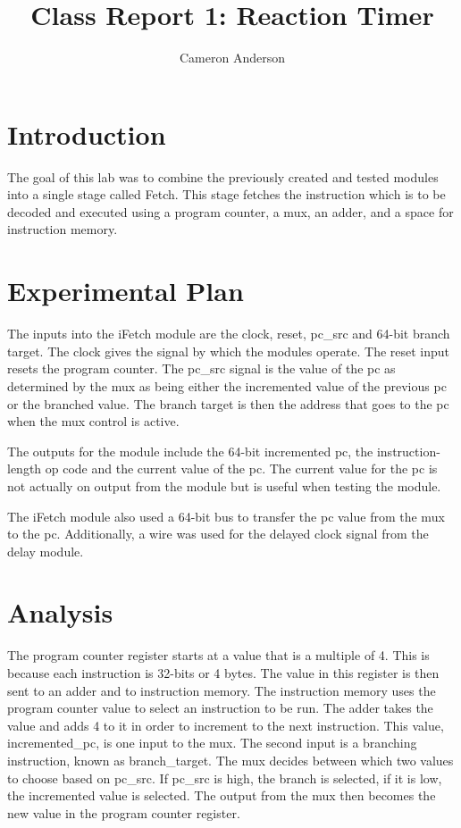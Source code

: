 \documentclass{article}
\author{Cameron Anderson}
\title{Class Report 1: Reaction Timer}
\begin{document}
\maketitle

\section{Introduction}
The goal of this lab was to combine the previously created and tested modules into a single stage called Fetch. This stage fetches the instruction which is to be decoded and executed using a program counter, a mux, an adder, and a space for instruction memory.

\section{Experimental Plan}
The inputs into the iFetch module are the clock, reset, pc\_src and 64-bit branch target. The clock gives the signal by which the modules operate. The reset input resets the program counter. The pc\_src signal is the value of the pc as determined by the mux as being either the incremented value of the previous pc or the branched value.  The branch target is then the address that goes to the pc when the mux control is active.
     
The outputs for the module include the 64-bit incremented pc, the instruction-length op code and the current value of the pc. The current value for the pc is not actually on output from the module but is useful when testing the module. 

The iFetch module also used a 64-bit bus to transfer the pc value from the mux to the pc. Additionally, a wire was used for the delayed clock signal from the delay module.

\section{Analysis}
The program counter register starts at a value that is a multiple of 4. This is because each instruction is 32-bits or 4 bytes. The value in this register is then sent to an adder and to instruction memory. The instruction memory uses the program counter value to select an instruction to be run. The adder takes the value and adds 4 to it in order to increment to the next instruction. This value, incremented\_pc, is one input to the mux. The second input is a branching instruction, known as branch\_target. The mux decides between which two values to choose based on pc\_src. If pc\_src is high, the branch is selected, if it is low, the incremented value is selected. The output from the mux then becomes the new value in the program counter register. 
\end{document}
